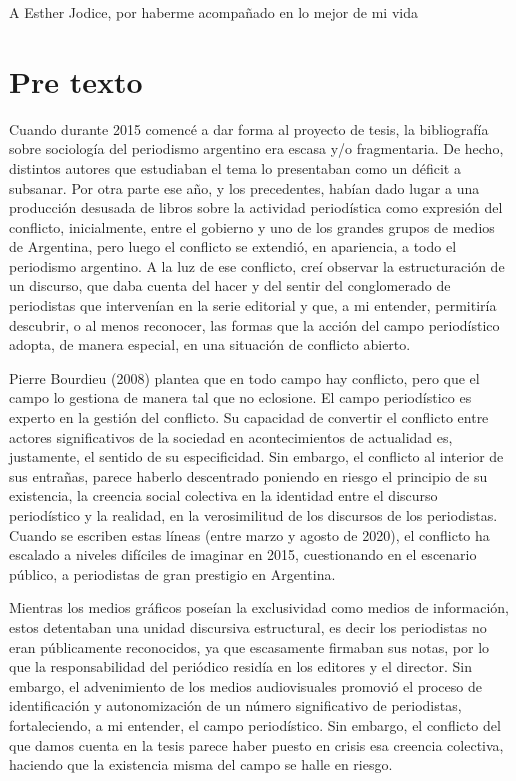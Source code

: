 A Esther Jodice, por haberme acompañado en lo mejor de mi vida

\chapter{Pre texto}

Cuando durante 2015 comencé a dar forma al proyecto de tesis, la bibliografía sobre sociología del periodismo argentino era escasa y/o fragmentaria. De hecho, distintos autores que estudiaban el tema lo presentaban como un déficit a subsanar. Por otra parte ese año, y los precedentes, habían dado lugar a una producción desusada de libros sobre la actividad periodística como expresión del conflicto, inicialmente, entre el gobierno y uno de los grandes grupos de medios de Argentina, pero luego el conflicto se extendió, en apariencia, a todo el periodismo argentino. A la luz de ese conflicto, creí observar la estructuración de un discurso, que daba cuenta del hacer y del sentir del conglomerado de periodistas que intervenían en la serie editorial y que, a mi entender, permitiría descubrir, o al menos reconocer, las formas que la acción del campo periodístico adopta, de manera especial, en una situación de conflicto abierto.

Pierre Bourdieu (2008) plantea que en todo campo hay conflicto, pero que el campo lo gestiona de manera tal que no eclosione. El campo periodístico es experto en la gestión del conflicto. Su capacidad de convertir el conflicto entre actores significativos de la sociedad en acontecimientos de actualidad es, justamente, el sentido de su especificidad. Sin embargo, el conflicto al interior de sus entrañas, parece haberlo descentrado poniendo en riesgo el principio de su existencia, la creencia social colectiva en la identidad entre el discurso periodístico y la realidad, en la verosimilitud de los discursos de los periodistas. Cuando se escriben estas líneas (entre marzo y agosto de 2020), el conflicto ha escalado a niveles difíciles de imaginar en 2015, cuestionando en el escenario público, a periodistas de gran prestigio en Argentina.

Mientras los medios gráficos poseían la exclusividad como medios de información, estos detentaban una unidad discursiva estructural, es decir los periodistas no eran públicamente reconocidos, ya que escasamente firmaban sus notas, por lo que la responsabilidad del periódico residía en los editores y el director. Sin embargo, el advenimiento de los medios audiovisuales promovió el proceso de identificación y autonomización de un número significativo de periodistas, fortaleciendo, a mi entender, el campo periodístico. Sin embargo, el conflicto del que damos cuenta en la tesis parece haber puesto en crisis esa creencia colectiva, haciendo que la existencia misma del campo se halle en riesgo.


